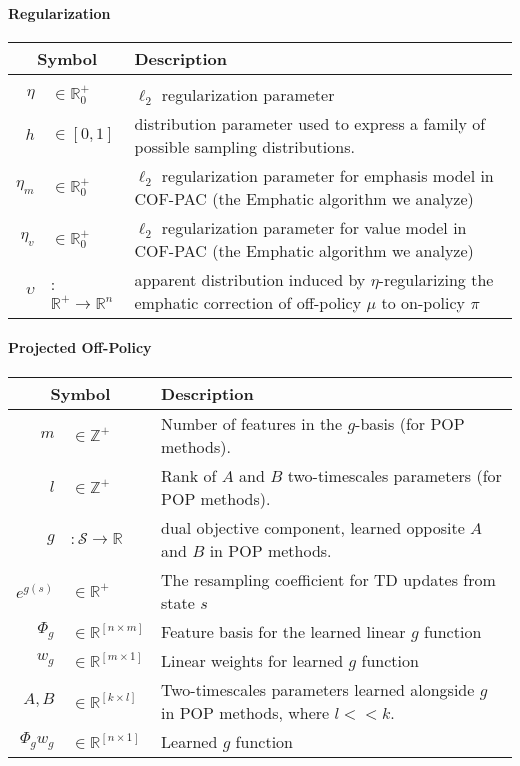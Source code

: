 \paragraph{Regularization}
\begin{longtable}{rl p{4in}}\hline\hline
	\multicolumn{2}{c}{Symbol} & Description
	\\\hline\endhead
	\\  $\eta$ & $\in \mathbb R^+_0$ & $\ell_2$ regularization parameter
	\\  $h$ & $\in[0, 1]$ & distribution parameter used to express a family of possible sampling distributions.
	\\  $\eta_m$ & $\in \mathbb R^+_0$ & $\ell_2$ regularization parameter for emphasis model in COF-PAC (the Emphatic algorithm we analyze)
	\\  $\eta_v$ & $\in \mathbb R^+_0$ & $\ell_2$ regularization parameter for value model in COF-PAC (the Emphatic algorithm we analyze)
	\\  $\upsilon$ & : $\mathbb R^+ \to \mathbb R^{n}$ & apparent distribution induced by $\eta$-regularizing the emphatic correction of off-policy $\mu$ to on-policy $\pi$
	\\ \hline\hline
\end{longtable}


\paragraph{Projected Off-Policy}
\begin{longtable}{rl p{4in}}\hline\hline
	\multicolumn{2}{c}{Symbol} & Description
	\\\hline\endhead
	$m$                        & $\in\mathbb Z^+$ & Number of features in the $g$-basis (for POP methods).
	\\  $l$ & $\in\mathbb Z^+$ & Rank of $A$ and $B$ two-timescales parameters (for POP methods).
	\\ $g$                        & $: \mathcal S \to \mathbb R$ & dual objective component, learned opposite $A$ and $B$ in POP methods.
	\\  $e^{g(s)}$ & $\in \mathbb R^+$ & The resampling coefficient for TD updates from state $s$
	\\  $\Phi_g$ & $\in \mathbb R^{[n\times m]}$ & Feature basis for the learned linear $g$ function
	\\  $w_g$ & $\in \mathbb R^{[m\times 1]}$ & Linear weights for learned $g$ function
	\\  $A, B$ & $\in \mathbb R^{[k\times l]}$ & Two-timescales parameters learned alongside $g$ in POP methods, where $l << k$.
	\\  $\Phi_g w_g$ & $\in \mathbb R^{[n\times 1]}$ & Learned $g$ function
	\\ \hline\hline
\end{longtable}
